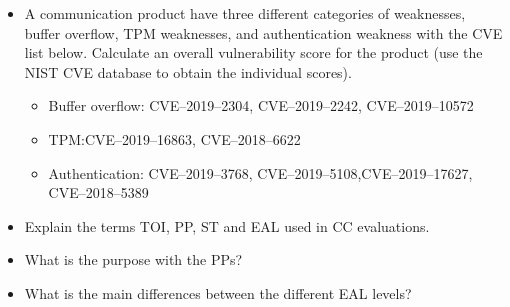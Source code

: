 \begin{itemize}
\item A communication product have three different categories of weaknesses, buffer overflow, TPM weaknesses, and authentication weakness with the CVE list below. Calculate an overall vulnerability score for the product (use the NIST CVE database to obtain the individual scores).
  \begin{itemize}[noitemsep]
  \item Buffer overflow: CVE--2019--2304, CVE--2019--2242, CVE--2019--10572
  \item TPM:\@ CVE--2019--16863, CVE--2018--6622
  \item Authentication: CVE--2019--3768, CVE--2019--5108,CVE--2019--17627, CVE--2018--5389
  \end{itemize}

\item Explain the terms TOI, PP, ST and EAL used in CC evaluations.
\item What is the purpose with the PPs?
\item What is the main differences between the different EAL levels?
\end{itemize}

